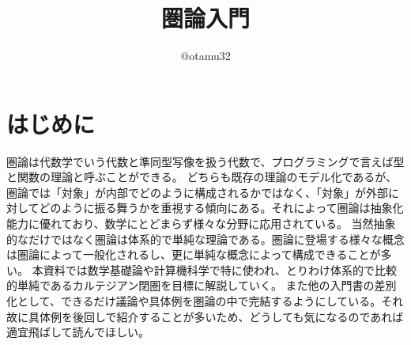 \documentclass[uplatex,dvipdfmx]{jsarticle}
\numberwithin{proof}{subsection}
\numberwithin{prop}{subsection}
\numberwithin{define}{subsection}
\begin{document}
	\title{圏論入門}
  \author{@otamu32}
	\maketitle
	\tableofcontents
	\section{はじめに}
  圏論は代数学でいう代数と準同型写像を扱う代数で、プログラミングで言えば型と関数の理論と呼ぶことができる。
  どちらも既存の理論のモデル化であるが、圏論では「対象」が内部でどのように構成されるかではなく、「対象」が外部に対してどのように振る舞うかを重視する傾向にある。それによって圏論は抽象化能力に優れており、数学にとどまらず様々な分野に応用されている。
  当然抽象的なだけではなく圏論は体系的で単純な理論である。圏論に登場する様々な概念は圏論によって一般化されるし、更に単純な概念によって構成できることが多い。
	本資料では数学基礎論や計算機科学で特に使われ、とりわけ体系的で比較的単純であるカルテジアン閉圏を目標に解説していく。
	また他の入門書の差別化として、できるだけ議論や具体例を圏論の中で完結するようにしている。それ故に具体例を後回しで紹介することが多いため、どうしても気になるのであれば適宜飛ばして読んでほしい。
\end{document}
